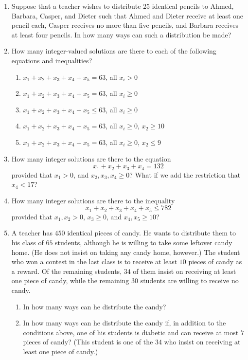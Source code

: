 \begin{enumerate}
 \item Suppose that a teacher wishes to distribute $25$ identical
    pencils to Ahmed, Barbara, Casper, and Dieter such that Ahmed and
    Dieter receive at least one pencil each, Casper receives no more
    than five pencils, and Barbara receives at least four pencils. In
    how many ways can such a distribution be made?
  \item How many integer-valued solutions are there to each of the
    following equations and inequalities?
    \begin{enumerate}
    \item $x_1+x_2+x_3+x_4+x_5=63$, all $x_i>0$
    \item $x_1+x_2+x_3+x_4+x_5=63$, all $x_i\geq 0$
    \item $x_1+x_2+x_3+x_4+x_5\leq 63$, all $x_i\geq 0$
    \item $x_1+x_2+x_3+x_4+x_5=63$, all $x_i\geq 0$, $x_2\geq 10$
    \item $x_1+x_2+x_3+x_4+x_5=63$, all $x_i\geq 0$, $x_2\leq 9$
    \end{enumerate}
  \item How many integer solutions are there to the equation
    \[x_1+x_2+x_3+x_4 = 132\]
    provided that $x_1>0$, and $x_2,x_3,x_4\geq 0$? What if we add the
    restriction that $x_4<17$?
  \item How many integer solutions are there to the inequality
    \[x_1+x_2+x_3+x_4+x_5\leq 782\] provided that
    $x_1,x_2>0$, $x_3\geq 0$, and $x_4,x_5\geq 10$?
  \item A teacher has $450$ identical pieces of candy. He wants to
    distribute them to his class of $65$ students, although he is
    willing to take some leftover candy home. (He does not insist on
    taking any candy home, however.) The student who won a contest in
    the last class is to receive at least $10$ pieces of candy as a
    reward. Of the remaining students, $34$ of them insist on
    receiving at least one piece of candy, while the remaining $30$
    students are willing to receive no candy.
    \begin{enumerate}
    \item In how many ways can he distribute the candy?
    \item In how many ways can he distribute the candy if, in addition
      to the conditions above, one of his students is diabetic and can
      receive at most $7$ pieces of candy?  (This student is one of
      the $34$ who insist on receiving at least one piece of candy.)
   \end{enumerate}

\end{enumerate}
